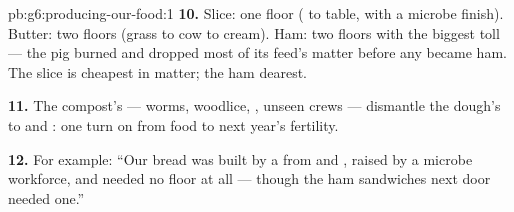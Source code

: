 \begin{solution}{pb:g6:producing-our-food:1}
\textbf{10.} Slice: one floor ( to table, with a
microbe finish). Butter: two floors (grass to cow to
cream). Ham: two floors with the biggest toll --- the pig
burned and dropped most of its feed's matter before any
became ham. The slice is cheapest in matter; the ham
dearest.

\textbf{11.} The compost's  --- worms, woodlice,
, unseen crews --- dismantle the dough's  to  and : one turn on from food
to next year's  fertility.

\textbf{12.} For example: ``Our bread was built by a
 from  and , raised by a microbe
workforce, and needed no  floor at all --- though
the ham sandwiches next door needed one.''
\end{solution}
